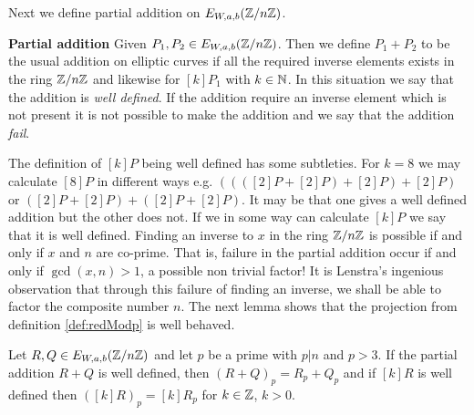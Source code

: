 Next we define partial addition on $E_{W,a,b}(\mathbb{Z}/n\mathbb{Z})$. 
\begin{defn}\label{defn:partialAdd}
\textbf{Partial addition} Given $P_1,P_2\in E_{W,a,b}(\mathbb{Z}/n\mathbb{Z})$. Then we define $P_1+P_2$ to be the usual addition on elliptic curves if all the required inverse elements exists in the ring $\mathbb{Z}/n\mathbb{Z}$ and likewise for $[k]P_1$ with $k\in\mathbb{N}$. In this situation we say that the addition is \textit{well defined}. If the addition require an inverse element which is not present it is not possible to make the addition and we say that the addition \textit{fail}.
\end{defn}
The definition of $[k]P$ being well defined has some subtleties. For $k=8$ we may calculate $[8]P$ in different ways e.g. $((([2]P+[2]P)+[2]P)+[2]P)$ or $([2]P+[2]P)+([2]P+[2]P)$. It may be that one gives a well defined addition but the other does not. If we in some way can calculate $[k]P$ we say that it is well defined. Finding an inverse to $x$ in the ring $\mathbb{Z}/n\mathbb{Z}$ is possible if and only if $x$ and $n$ are co-prime. That is, failure in the partial addition occur if and only if $\gcd(x,n)>1$, a possible non trivial factor! It is Lenstra's ingenious observation that through this failure of finding an inverse, we shall be able to factor the composite number $n$. The next lemma shows that the projection from definition \ref{def:redModp} is well behaved.
\begin{lem}\label{lem:pseudoAddition}
Let $R,Q\in E_{W,a,b}(\mathbb{Z}/n\mathbb{Z})$ and let $p$ be a prime with $p\vert n$ and $p>3$. If the partial addition $R+Q$ is well defined, then $\left(R+Q\right)_p=R_p+Q_p$ and if $[k]R$ is well defined then $([k]R)_p=[k]R_p$ for $k\in \mathbb{Z}$, $k>0$.
\end{lem}
